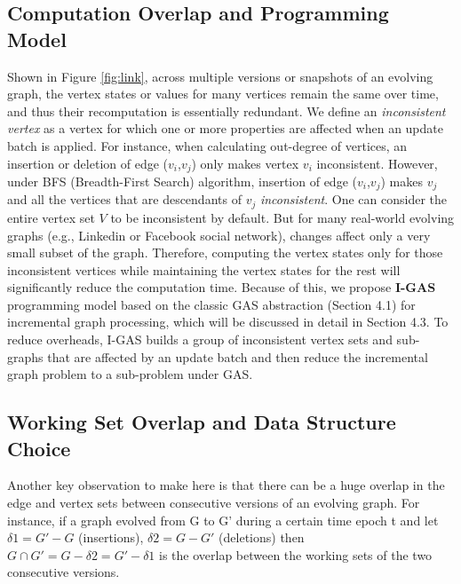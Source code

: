 \subsection{Computation Overlap and Programming Model}

Shown in Figure \ref{fig:link}, across multiple versions or snapshots of an evolving graph, the vertex states or values for many vertices remain the same over time, and thus their recomputation is essentially redundant. We define an \textit{inconsistent vertex} as a vertex for which one or more properties are affected when an update batch is applied. For instance, when calculating out-degree of vertices, an insertion or deletion of edge ($v_i$,$v_j$) only makes vertex $v_i$ inconsistent. However, under BFS (Breadth-First Search) algorithm, insertion of edge ($v_i$,$v_j$) makes $v_j$ and all the vertices that are descendants of $v_j$ \textit{inconsistent}. One can consider the entire vertex set $V$ to be inconsistent by default. But for many real-world evolving graphs (e.g., Linkedin or Facebook social network), changes affect only a very small subset of the graph. Therefore, computing the vertex states only for those inconsistent vertices while maintaining the vertex states for the rest will significantly reduce the computation time. Because of this,  we propose \textbf{I-GAS} programming model based on the classic GAS abstraction (Section 4.1) for incremental graph processing, which will be discussed in detail in Section 4.3. To reduce overheads, I-GAS builds a group of inconsistent vertex sets and sub-graphs that are affected by an update batch and then reduce the incremental graph problem to a sub-problem under GAS.


\subsection{Working Set Overlap and Data Structure Choice}

 Another key observation to make here is that there can be a huge overlap in the edge and vertex sets between consecutive versions of an evolving graph. For instance, if a graph evolved from G to G' during a certain time epoch t and let $\delta1 = G'-G$ (insertions), $\delta2 = G-G'$ (deletions) then $G \cap G' = G- \delta2 = G' - \delta1$ is the overlap between the working sets of the two consecutive versions. 


